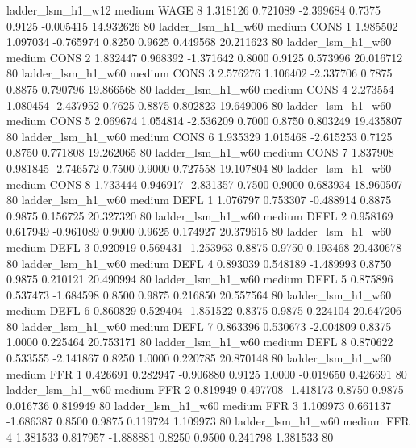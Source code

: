      ladder_lsm_h1_w12     medium     WAGE                 8  1.318126 0.721089 -2.399684 0.7375 0.9125 -0.005415   14.932626 80
     ladder_lsm_h1_w60     medium     CONS                 1  1.985502 1.097034 -0.765974 0.8250 0.9625  0.449568   20.211623 80
     ladder_lsm_h1_w60     medium     CONS                 2  1.832447 0.968392 -1.371642 0.8000 0.9125  0.573996   20.016712 80
     ladder_lsm_h1_w60     medium     CONS                 3  2.576276 1.106402 -2.337706 0.7875 0.8875  0.790796   19.866568 80
     ladder_lsm_h1_w60     medium     CONS                 4  2.273554 1.080454 -2.437952 0.7625 0.8875  0.802823   19.649006 80
     ladder_lsm_h1_w60     medium     CONS                 5  2.069674 1.054814 -2.536209 0.7000 0.8750  0.803249   19.435807 80
     ladder_lsm_h1_w60     medium     CONS                 6  1.935329 1.015468 -2.615253 0.7125 0.8750  0.771808   19.262065 80
     ladder_lsm_h1_w60     medium     CONS                 7  1.837908 0.981845 -2.746572 0.7500 0.9000  0.727558   19.107804 80
     ladder_lsm_h1_w60     medium     CONS                 8  1.733444 0.946917 -2.831357 0.7500 0.9000  0.683934   18.960507 80
     ladder_lsm_h1_w60     medium     DEFL                 1  1.076797 0.753307 -0.488914 0.8875 0.9875  0.156725   20.327320 80
     ladder_lsm_h1_w60     medium     DEFL                 2  0.958169 0.617949 -0.961089 0.9000 0.9625  0.174927   20.379615 80
     ladder_lsm_h1_w60     medium     DEFL                 3  0.920919 0.569431 -1.253963 0.8875 0.9750  0.193468   20.430678 80
     ladder_lsm_h1_w60     medium     DEFL                 4  0.893039 0.548189 -1.489993 0.8750 0.9875  0.210121   20.490994 80
     ladder_lsm_h1_w60     medium     DEFL                 5  0.875896 0.537473 -1.684598 0.8500 0.9875  0.216850   20.557564 80
     ladder_lsm_h1_w60     medium     DEFL                 6  0.860829 0.529404 -1.851522 0.8375 0.9875  0.224104   20.647206 80
     ladder_lsm_h1_w60     medium     DEFL                 7  0.863396 0.530673 -2.004809 0.8375 1.0000  0.225464   20.753171 80
     ladder_lsm_h1_w60     medium     DEFL                 8  0.870622 0.533555 -2.141867 0.8250 1.0000  0.220785   20.870148 80
     ladder_lsm_h1_w60     medium      FFR                 1  0.426691 0.282947 -0.906880 0.9125 1.0000 -0.019650    0.426691 80
     ladder_lsm_h1_w60     medium      FFR                 2  0.819949 0.497708 -1.418173 0.8750 0.9875  0.016736    0.819949 80
     ladder_lsm_h1_w60     medium      FFR                 3  1.109973 0.661137 -1.686387 0.8500 0.9875  0.119724    1.109973 80
     ladder_lsm_h1_w60     medium      FFR                 4  1.381533 0.817957 -1.888881 0.8250 0.9500  0.241798    1.381533 80
